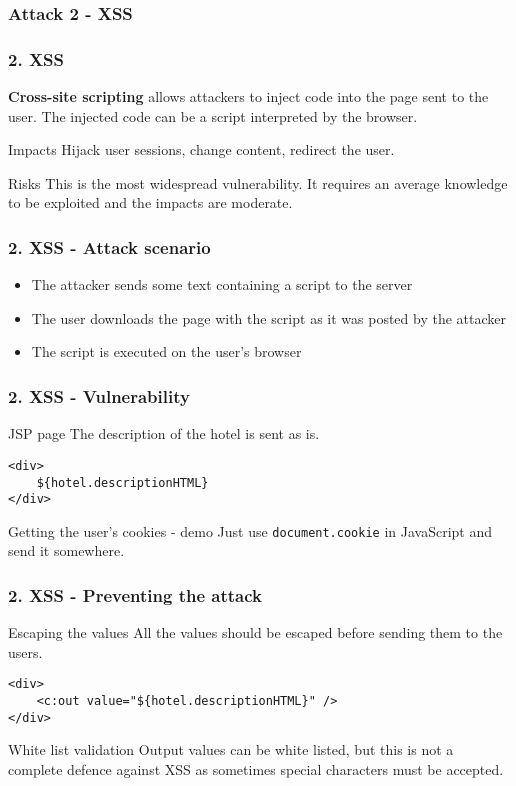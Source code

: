 \subsubsection{Attack 2 - XSS}

\begin{frame}
\frametitle{2. XSS}
\textbf{Cross-site scripting} allows attackers to inject code into the page
sent to the user. The injected code can be a script interpreted by the
browser.
\begin{block}{Impacts}
Hijack user sessions, change content, redirect the user.
\end{block}
\begin{block}{Risks}
This is \alert{the most widespread} vulnerability.
It requires an average knowledge to be exploited and the impacts are moderate.
\end{block}
\end{frame}

\begin{frame}
\frametitle{2. XSS - Attack scenario}
\begin{itemize}
\item The attacker sends some text containing a script to the server
\item The user downloads the page with the script as it was posted by the
	attacker
\item The script is executed on the user's browser %
\end{itemize}
\end{frame}

\begin{frame}[fragile]
\frametitle{2. XSS - Vulnerability}
\begin{exampleblock}{JSP page}
The description of the hotel is sent as is.
\begin{lstlisting}
<div>
	${hotel.descriptionHTML}
</div>
\end{lstlisting}
\end{exampleblock}
\pause
\begin{exampleblock}{Getting the user's cookies - demo}
Just use \lstinline!document.cookie! in JavaScript and send it somewhere.
\end{exampleblock}
\end{frame}

\begin{frame}[fragile]
\frametitle{2. XSS - Preventing the attack}
\begin{block}{Escaping the values}
All the values should be escaped before sending them to the users.
\begin{lstlisting}
<div>
	<c:out value="${hotel.descriptionHTML}" />
</div>
\end{lstlisting}
\end{block}
\begin{block}{White list validation}
Output values can be white listed, but this is not a complete defence against
XSS as sometimes special characters must be accepted.
\end{block}
\end{frame}

